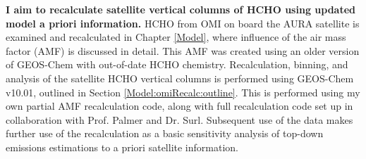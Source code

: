   \textbf{I aim to recalculate satellite vertical columns of HCHO using updated model a priori information.}
  HCHO from OMI on board the AURA satellite %
  is examined and recalculated in Chapter \ref{Model}, where influence of the air mass factor (AMF) is discussed in detail. %
  This AMF was created using an older version of GEOS-Chem with out-of-date HCHO chemistry.
  Recalculation, binning, and analysis of the satellite HCHO vertical columns is performed using GEOS-Chem v10.01, outlined in Section \ref{Model:omiRecalc:outline}.
  This is performed using my own partial AMF recalculation code, along with full recalculation code set up in collaboration with Prof. Palmer and Dr. Surl.
  Subsequent use of the data makes further use of the recalculation as a basic sensitivity analysis of top-down emissions estimations to a priori satellite information.
   
